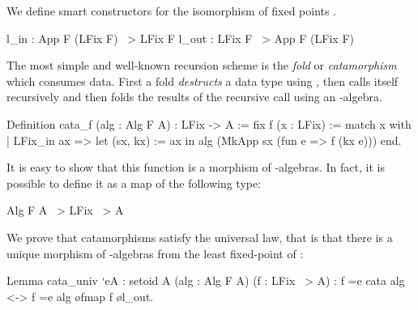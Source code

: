 \documentclass[anonymous, a4paper, UKenglish, cleveref, autoref, thm-restate]{lipics-v2021}
\newcommand{\dcas}[1]{\textcolor{ForestGreen}{\textsc{David}: #1}}
\newcommand{\cata}[1]{\lbans #1 \rbans}
\newcommand{\ana}[1]{\llens #1 \rlens}
\newcommand{\operator}[1]{\textsf{#1}}
\newcommand{\InOp}{\operator{in}^{\circ}}
\newcommand{\OutOp}{\operator{out}^{\circ}}
\begin{document}


We define smart constructors for the isomorphism of fixed points
.
\begin{coqcode}
l_in : App F (LFix F) ~> LFix F
l_out : LFix F ~> App F (LFix F)
\end{coqcode}

The most simple and well-known recursion scheme is the \emph{fold} or
\emph{catamorphism} which consumes data. First a fold \emph{destructs} a data
type using , then calls itself recursively and then folds the
results of the recursive call using an -algebra.
\begin{coqcode}
Definition cata_f (alg : Alg F A) : LFix -> A
:= fix f (x : LFix) :=
  match x with
  | LFix_in ax =>
      let (sx, kx) := ax in
      alg (MkApp sx (fun e => f (kx e)))
  end.
\end{coqcode}
It is easy to show that this function is a morphism of -algebras. In fact,
it is possible to define it as a map of the following type:
\begin{coqcode}
Alg F A ~> LFix ~> A
\end{coqcode}

We prove that catamorphisms satisfy the universal law, that is
that there is a unique morphism of -algebras from the least fixed-point of :
\begin{coqcode}
Lemma cata_univ `{eA : setoid A} (alg : Alg F A) (f : LFix ~> A)
    : f =e cata alg <-> f =e alg \o fmap f \o l_out.
\end{coqcode}
\end{document}
